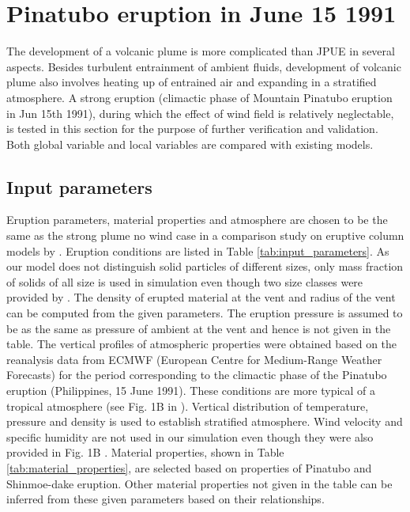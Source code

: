 \section{Pinatubo eruption in June 15 1991}
The development of a volcanic plume is more complicated than JPUE in several aspects. Besides turbulent entrainment of ambient fluids, development of volcanic plume also involves heating up of entrained air and expanding in a stratified atmosphere. A strong eruption (climactic phase of Mountain Pinatubo eruption in Jun 15th 1991), during which the effect of wind field is relatively neglectable, is tested in this section for the purpose of further verification and validation.
Both global variable and local variables are compared with existing models.

\subsection{Input parameters}
Eruption parameters, material properties and atmosphere are chosen to be the same as the strong plume no wind case in a comparison study on eruptive column models by \citet {costa2016results}. Eruption conditions are listed in Table \ref{tab:input_parameters}. As our model does not distinguish solid particles of different sizes, only mass fraction of solids of all size is used in simulation even though two size classes were provided by \citet {costa2016results}. The density of erupted material at the vent and radius of the vent can be computed from the given parameters. The eruption pressure is assumed to be as the same as pressure of ambient at the vent and hence is not given in the table. The vertical profiles of atmospheric properties were obtained based on the reanalysis data from ECMWF (European Centre for Medium-Range Weather Forecasts) for the period corresponding to the climactic phase of the Pinatubo eruption (Philippines, 15 June 1991). These conditions are more typical of a tropical atmosphere (see Fig. 1B in \citep{costa2016results}).  
Vertical distribution of temperature, pressure and density is used to establish stratified atmosphere. Wind velocity and specific humidity are not used in our simulation even though they were also provided in Fig. 1B \citep{costa2016results}. Material properties, shown in Table \ref{tab:material_properties}, are selected based on properties of Pinatubo and Shinmoe-dake eruption. Other material properties not given in the table can be inferred from these given parameters based on their relationships.


